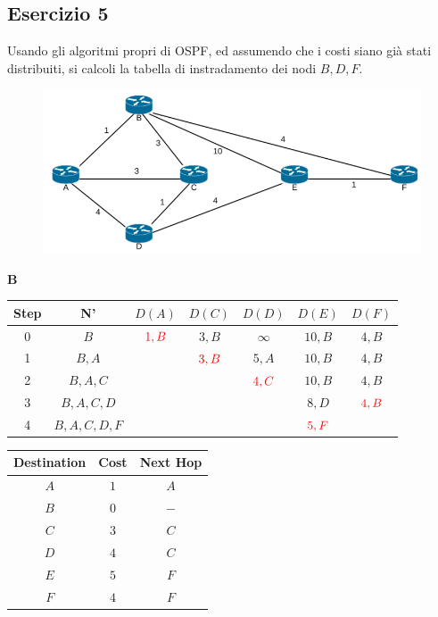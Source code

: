 \documentclass[10pt]{article}
\begin{document}
	\subsection{Esercizio 5}
	Usando gli algoritmi propri di OSPF, ed assumendo che i costi siano già stati distribuiti, si calcoli la tabella di instradamento dei nodi ${B,D,F}$.
	\begin{figure}[h]
	\centering
	\includegraphics[width=13cm]{es4}
	\end{figure}
	\begin{center}
	 	\textbf{B}
 		\begin{tabular}{||c c c c c c c||} 
 			\hline
 			Step & N' & $D(A)$ & $D(C)$ & $D(D)$ & $D(E)$ & $D(F)$ \\[0.5ex] 
 			\hline\hline
 			0 & $B$ & $\color{red} 1,B$ & $3,B$ & $\infty$ & $10,B$ & $4,B$ \\
 			\hline
 			1 & $B,A$ &  & $\color{red} 3,B$ & $5,A$ & $10,B$ & $4,B$ \\
 			\hline
 			2 & $B,A,C$ & & & $\color{red} 4,C$ & $10,B$ & $4,B$ \\
 			\hline
 			3 & $B,A,C,D$ & & & & $8,D$ & $\color{red} 4,B$ \\
 			\hline
 			4 & $B,A,C,D,F$ & & & & $\color{red} 5,F$ & \\[0.5ex]  
 			\hline
		\end{tabular}
		\quad
		\begin{tabular}{||c || c || c||}
			\hline
 			Destination & Cost & Next Hop\\[0.5ex] 
 			\hline\hline
			$A$ & $1$ & $A$\\
			$B$ & $0$ & $-$\\
 			$C$ & $3$ & $C$\\
			$D$ & $4$ & $C$\\
			$E$ & $5$ & $F$\\
			$F$ & $4$ & $F$\\[0.5ex]
			\hline
		\end{tabular}
	\end{center}
	
\end{document}
